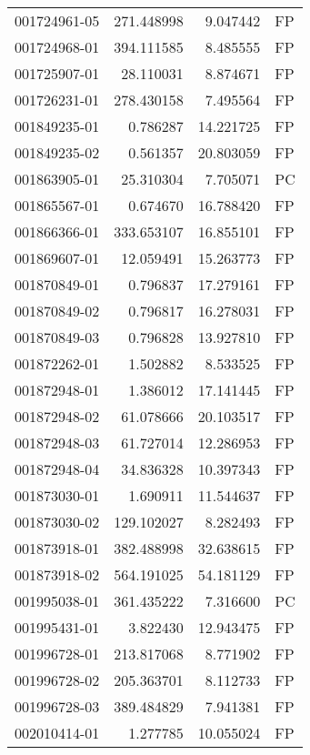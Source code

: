 \begin{tabular}{lrrl}
001724961-05 &  271.448998 &       9.047442 &   FP \\
001724968-01 &  394.111585 &       8.485555 &   FP \\
001725907-01 &   28.110031 &       8.874671 &   FP \\
001726231-01 &  278.430158 &       7.495564 &   FP \\
001849235-01 &    0.786287 &      14.221725 &   FP \\
001849235-02 &    0.561357 &      20.803059 &   FP \\
001863905-01 &   25.310304 &       7.705071 &   PC \\
001865567-01 &    0.674670 &      16.788420 &   FP \\
001866366-01 &  333.653107 &      16.855101 &   FP \\
001869607-01 &   12.059491 &      15.263773 &   FP \\
001870849-01 &    0.796837 &      17.279161 &   FP \\
001870849-02 &    0.796817 &      16.278031 &   FP \\
001870849-03 &    0.796828 &      13.927810 &   FP \\
001872262-01 &    1.502882 &       8.533525 &   FP \\
001872948-01 &    1.386012 &      17.141445 &   FP \\
001872948-02 &   61.078666 &      20.103517 &   FP \\
001872948-03 &   61.727014 &      12.286953 &   FP \\
001872948-04 &   34.836328 &      10.397343 &   FP \\
001873030-01 &    1.690911 &      11.544637 &   FP \\
001873030-02 &  129.102027 &       8.282493 &   FP \\
001873918-01 &  382.488998 &      32.638615 &   FP \\
001873918-02 &  564.191025 &      54.181129 &   FP \\
001995038-01 &  361.435222 &       7.316600 &   PC \\
001995431-01 &    3.822430 &      12.943475 &   FP \\
001996728-01 &  213.817068 &       8.771902 &   FP \\
001996728-02 &  205.363701 &       8.112733 &   FP \\
001996728-03 &  389.484829 &       7.941381 &   FP \\
002010414-01 &    1.277785 &      10.055024 &   FP \\

\end{tabular}
